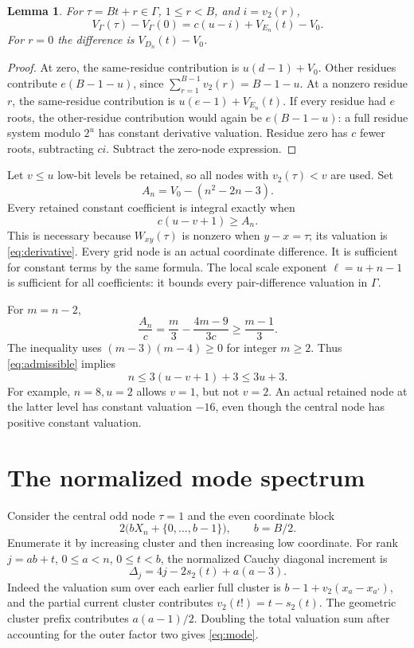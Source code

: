 \documentclass[11pt]{article}
\newtheorem{lemma}{Lemma}
\begin{document}
\begin{lemma}
For $\tau=Bt+r\in\Gamma$, $1\le r<B$, and $i=v_2(r)$,
\begin{equation}
 V_\Gamma(\tau)-V_\Gamma(0)
 =c(u-i)+V_{E_n}(t)-V_0.
 \label{eq:derivative}
\end{equation}
For $r=0$ the difference is $V_{D_n}(t)-V_0$.
\end{lemma}
\begin{proof}
At zero, the same-residue contribution is $u(d-1)+V_0$.
Other residues contribute $e(B-1-u)$, since
$\sum_{r=1}^{B-1}v_2(r)=B-1-u$.
At a nonzero residue $r$, the same-residue contribution is
$u(e-1)+V_{E_n}(t)$. If every residue had $e$ roots, the other-residue
contribution would again be $e(B-1-u)$: a full residue system modulo
$2^u$ has constant derivative valuation. Residue zero has $c$ fewer
roots, subtracting $ci$. Subtract the zero-node expression.
\end{proof}

Let $v\le u$ low-bit levels be retained, so all nodes with
$v_2(\tau)<v$ are used. Set
\[
 A_n=V_0-(n^2-2n-3).
\]
Every retained constant coefficient is integral exactly when
\begin{equation}
 c(u-v+1)\ge A_n.
 \label{eq:admissible}
\end{equation}
This is necessary because $W_{xy}(\tau)$ is nonzero when $y-x=\tau$;
its valuation is \eqref{eq:derivative}. Every grid node is an actual
coordinate difference. It is sufficient for constant terms by the same
formula. The local scale exponent $\ell=u+n-1$ is sufficient for all
coefficients: it bounds every pair-difference valuation in $\Gamma$.

For $m=n-2$,
\[
 \frac{A_n}{c}=\frac m3-\frac{4m-9}{3c}
 \ge\frac{m-1}{3}.
\]
The inequality uses $(m-3)(m-4)\ge0$ for integer $m\ge2$.
Thus \eqref{eq:admissible} implies
\begin{equation}
 n\le3(u-v+1)+3\le3u+3.
 \label{eq:cluster-size}
\end{equation}
For example, $n=8,u=2$ allows $v=1$, but not $v=2$.
An actual retained node at the latter level has constant valuation $-16$,
even though the central node has positive constant valuation.

\section{The normalized mode spectrum}
Consider the central odd node $\tau=1$ and the even coordinate block
\[
 2\bigl(b X_n+\{0,\ldots,b-1\}\bigr),\qquad b=B/2.
\]
Enumerate it by increasing cluster and then increasing low coordinate.
For rank $j=ab+t$, $0\le a<n$, $0\le t<b$, the normalized Cauchy
diagonal increment is
\begin{equation}
 \Delta_j=4j-2s_2(t)+a(a-3).
 \label{eq:mode}
\end{equation}
Indeed the valuation sum over each earlier full cluster is
$b-1+v_2(x_a-x_{a'})$, and the partial current cluster contributes
$v_2(t!)=t-s_2(t)$. The geometric cluster prefix contributes
$a(a-1)/2$. Doubling the total valuation sum after accounting for the
outer factor two gives \eqref{eq:mode}.
\end{document}
